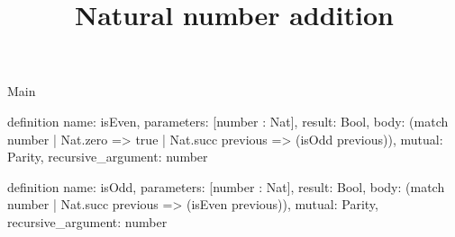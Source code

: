 \begin{lexlean}{Main}
\title{Natural number addition}
\begin{semanticmodule}
definition{
  name: isEven,
  parameters: [number : Nat],
  result: Bool,
  body: (match number | Nat.zero => true | Nat.succ previous => (isOdd previous)),
  mutual: Parity,
  recursive_argument: number
}

definition{
  name: isOdd,
  parameters: [number : Nat],
  result: Bool,
  body: (match number | Nat.succ previous => (isEven previous)),
  mutual: Parity,
  recursive_argument: number
}
\end{semanticmodule}
\end{lexlean}
